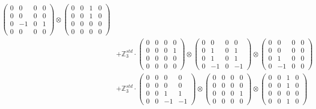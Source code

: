 \documentclass{article}
\begin{document}
{\begin{align}
            \begin{pmatrix} 0 & 0 & 0 & 0 \\ 0 & 0 & 0 & 0 \\ 0 & -1 & 0 & 1 \\ 0 & 0 & 0 & 0 \end{pmatrix} \otimes 
            \begin{pmatrix} 0 & 0 & 1 & 0 \\ 0 & 0 & 1 & 0 \\ 0 & 0 & 0 & 0 \\ 0 & 0 & 0 & 0 \end{pmatrix} \\ 
        &+ \label{Rs16-Rc11-Solution-6-c20} \mathbb{Z}_3^{std} \cdot 
            \begin{pmatrix} 0 & 0 & 0 & 0 \\ 0 & 0 & 0 & 1 \\ 0 & 0 & 0 & 0 \\ 0 & 0 & 0 & 0 \end{pmatrix} \otimes 
            \begin{pmatrix} 0 & 0 & 0 & 0 \\ 0 & 1 & 0 & 1 \\ 0 & 1 & 0 & 1 \\ 0 & -1 & 0 & -1 \end{pmatrix} \otimes 
            \begin{pmatrix} 0 & 0 & 0 & 0 \\ 0 & 0 & 0 & 0 \\ 0 & 1 & 0 & 0 \\ 0 & -1 & 0 & 0 \end{pmatrix} \\ 
        &+ \label{Rs16-Rc11-Solution-6-c21} \mathbb{Z}_3^{std} \cdot 
            \begin{pmatrix} 0 & 0 & 0 & 0 \\ 0 & 0 & 0 & 0 \\ 0 & 0 & 1 & 1 \\ 0 & 0 & -1 & -1 \end{pmatrix} \otimes 
            \begin{pmatrix} 0 & 0 & 0 & 0 \\ 0 & 0 & 0 & 0 \\ 0 & 0 & 0 & 1 \\ 0 & 0 & 0 & 0 \end{pmatrix} \otimes 
            \begin{pmatrix} 0 & 0 & 1 & 0 \\ 0 & 0 & 1 & 0 \\ 0 & 0 & 0 & 0 \\ 0 & 0 & 1 & 0 \end{pmatrix} \\ 

\end{align}}
\end{document}

